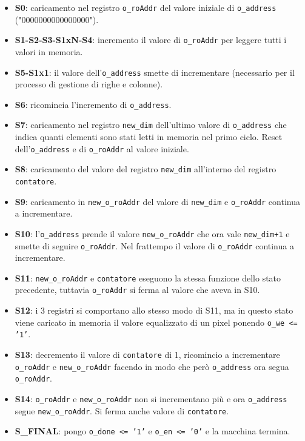 \documentclass[12pt, table, xcdraw]{article}
\begin{document}
\begin{itemize}
\item \textbf{S0}: caricamento nel registro \texttt{o\_roAddr} del valore iniziale di \texttt{o\_address} ("0000000000000000").
\item \textbf{S1-S2-S3-S1xN-S4}: incremento il valore di \texttt{o\_roAddr} per leggere tutti i valori in memoria.
\item \textbf{S5-S1x1}: il valore dell'\texttt{o\_address} smette di incrementare (necessario per il processo di gestione di righe e colonne).
\item \textbf{S6}: ricomincia l'incremento di \texttt{o\_address}.
\item \textbf{S7}: caricamento nel registro \texttt{new\_dim} dell'ultimo valore di \texttt{o\_address} che indica quanti elementi sono stati letti in memoria nel primo ciclo. Reset dell'\texttt{o\_address} e di \texttt{o\_roAddr} al valore iniziale.
\item \textbf{S8}: caricamento del valore del registro \texttt{new\_dim} all'interno del registro  \texttt{contatore}.
\item \textbf{S9}: caricamento in \texttt{new\_o\_roAddr} del valore di \texttt{new\_dim} e \texttt{o\_roAddr} continua a incrementare.
\item \textbf{S10}: l'\texttt{o\_address} prende il valore \texttt{new\_o\_roAddr} che ora vale \texttt{new\_dim+1} e smette di seguire \texttt{o\_roAddr}. Nel frattempo il valore di \texttt{o\_roAddr} continua a incrementare.
\item \textbf{S11}: \texttt{new\_o\_roAddr} e \texttt{contatore} eseguono la stessa funzione dello stato precedente, tuttavia \texttt{o\_roAddr} si ferma al valore che aveva in S10.
\item \textbf{S12}: i 3 registri si comportano allo stesso modo di S11, ma in questo stato viene caricato in memoria il valore equalizzato di un pixel ponendo \texttt{o\_we \textless = '1'}.
\item \textbf{S13}: decremento il valore di \texttt{contatore} di 1, ricomincio a incrementare \texttt{o\_roAddr} e \texttt{new\_o\_roAddr} facendo in modo che però \texttt{o\_address} ora segua \texttt{o\_roAddr}.
\item \textbf{S14}: \texttt{o\_roAddr} e \texttt{new\_o\_roAddr} non si incrementano più e ora \texttt{o\_address} segue \texttt{new\_o\_roAddr}. Si ferma anche valore di \texttt{contatore}.
\item \textbf{S\_FINAL}: pongo \texttt{o\_done \textless = '1'} e \texttt{o\_en \textless = '0'} e la macchina termina.
\end{itemize}
\end{document}
